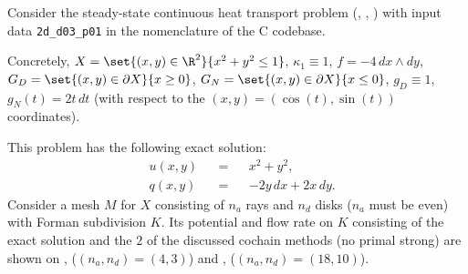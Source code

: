 \begin{example}
  \label{idec/diffusion/continuous/steady_state/examples/2d_d03_p01-example}
  Consider the steady-state continuous heat transport problem
  (,
   ,
   )
  with input data \verb|2d_d03_p01| in the nomenclature of the C codebase.

  Concretely,
    $X = \set{(x, y) \in \R^2}{x^2 + y^2 \leq 1}$,
    $\kappa_1 \equiv 1$,
    $f = - 4 \, d x \wedge d y$,
    $G_D = \set{(x, y) \in \partial X}{x \geq 0}$,
    $G_N = \set{(x, y) \in \partial X}{x \leq 0}$,
    $g_D \equiv 1$,
    $g_N(t) = 2 t \, d t$
    (with respect to the $(x, y) = (\cos(t), \sin(t))$ coordinates).

  This problem has the following exact solution:
  \begin{subequations}
    \begin{alignat}{3}
      & u(x, y) && = && x^2 + y^2, \\
      & q(x, y) && = && -2 y \, d x + 2 x \, d y.
    \end{alignat}
  \end{subequations}
  Consider a mesh $M$ for $X$ consisting of $n_a$ rays and $n_d$ disks
  ($n_a$ must be even) with Forman subdivision $K$.
  Its potential and flow rate on $K$ consisting of the exact solution and the
  $2$ of the discussed cochain methods (no primal strong) are shown on
  ,
  ($(n_a, n_d) = (4, 3)$)
  and
  ,
  ($(n_a, n_d) = (18, 10)$).
\end{example}
